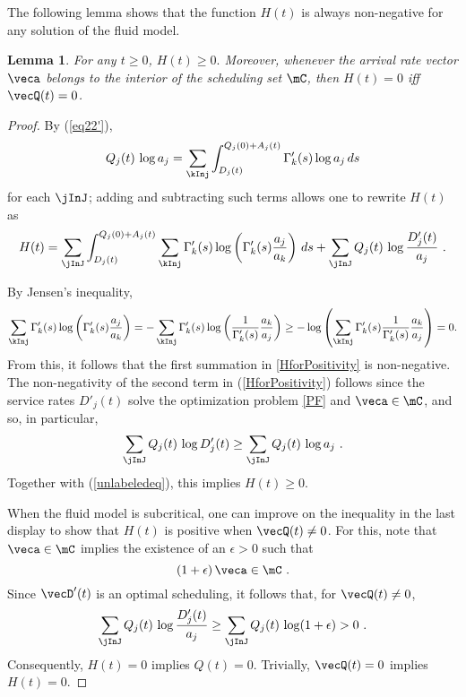 \documentclass{amsart}
\newtheorem{lemma}{Lemma}
\begin{document}
The following lemma shows that the function $H(t)$ is always non-negative for any solution of the fluid model.

\begin{lemma}\label{prop:H.not.zero}
For any $t\geq0$,
$H(t)\ge 0.$
Moreover, whenever the arrival rate vector $\veca$ belongs to the interior of the scheduling set $\mC$, then $H(t)=0$ iff $\vecQ(t)=0$.
\end{lemma}
\begin{proof}
By (\ref{eq22'}),
$$
Q_j(t) \, \log a_j =
  \sum_\kInj \int_{D_j(t)}^{Q_j(0)+A_j(t)}
    \Gamma'_k(s) \log a_j \, ds 
$$
for each $\jInJ$; adding and subtracting such terms
allows one to rewrite $H(t)$ as
\begin{equation}\label{HforPositivity}
H(t) 
 = \sum_\jInJ 
  \int_{D_j(t)}^{Q_j(0)+A_j(t)} \sum_\kInj 
    \Gamma'_k(s) \log \left(\Gamma'_k(s) \frac{a_j}{a_k}\right) \, ds
  + \sum_{\jInJ} Q_j(t) \, \log \frac{D'_j(t)}{a_j} \ .
\end{equation}
\iffalse
If we define the discrete probability distributions $\vecp$ and  $\vecq$, over the states $\kInj$, by $\vecp=(\Gamma'_k(s) : \kInj )$ and $\vecq= ( a_k/a_j : k \in j)$, we have that
$$
\sum_\kInj 
    \Gamma'_k(s) \log \left(\Gamma'_k(s) \frac{a_j}{a_k}\right)
= D(\vecp||\vecq).
$$
where $D(\vecp||\vecq)$ denotes the \emph{relative entropy} between the distributions $\vecp$ and $\vecq$.
\fi 
By  Jensen's inequality,  
\begin{equation}
\label{unlabeledeq}
\sum_\kInj 
    \Gamma'_k(s) \log \left(\Gamma'_k(s) \frac{a_j}{a_k}\right) = -\sum_\kInj 
    \Gamma'_k(s) \log \left( \frac{1}{ \Gamma'_k(s)} \frac{a_k}{a_j}\right)  \geq -\log \left(  \sum_\kInj 
    \Gamma'_k(s)    \frac{1}{ \Gamma'_k(s)} \frac{a_k}{a_j}\right) =0.
\end{equation}
From this, it follows that the first summation in \eqref{HforPositivity} is non-negative.
The non-negativity of the second term in (\ref{HforPositivity}) follows since  the service rates $D'_j(t)$ solve the optimization problem \eqref{PF} and  $\veca\in \mC$, and so, in particular,
$$
\sum_{\jInJ} Q_j(t) \, \log D'_j(t)
\geq 
\sum_{\jInJ} Q_j(t) \, \log a_j \ .
$$
Together with (\ref{unlabeledeq}), this implies $H(t)\geq 0$.

When the fluid model is subcritical, one can improve on the inequality in the last display to show that $H(t)$ is positive when $\vecQ(t) \neq 0$.  For this, note that
$\veca \in \mC$ implies the existence of an  $\epsilon > 0$ such that
$$ (1+\epsilon) \, \veca \in \mC \ .$$
 Since $\vecD'(t)$ is an optimal scheduling, 
it follows that, for $\vecQ(t) \not = 0$,
\begin{equation}\label{HQ}
\sum_{\jInJ} Q_j(t) \, \log \frac{D'_j(t)}{a_j}
\geq 
\sum_{\jInJ} Q_j(t) \, \log (1+\epsilon) > 0 \ .
\end{equation}
Consequently, $H(t)=0$ implies $Q(t)=0$.  Trivially, $\vecQ(t)=0$ implies $H(t)=0$.
\end{proof}
 
\end{document}
